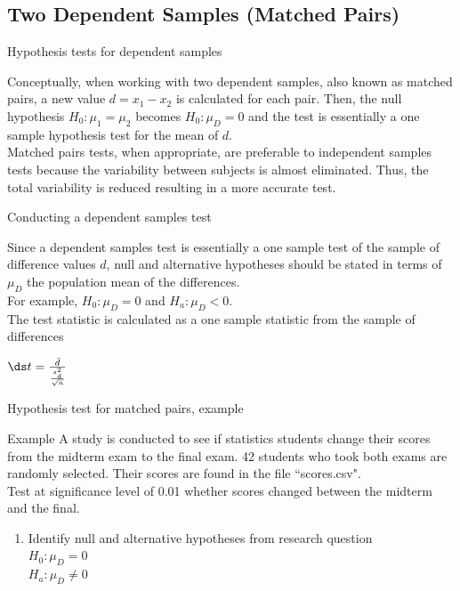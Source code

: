 \documentclass[xcolor=table, handout]{beamer}
\begin{document}
\subsection{Two Dependent Samples (Matched Pairs)}

\begin{frame}{Hypothesis tests for dependent samples}
\begin{block}{}
\large
Conceptually, when working with two dependent samples, also known as matched pairs, a new value $d = x_1 - x_2$ is calculated for each pair. Then, the null hypothesis $H_0: \mu_1 = \mu_2$ becomes $H_0: \mu_D = 0$ and the test is essentially a one sample hypothesis test for the mean of $d$.\\
\pause\medskip
Matched pairs tests, when appropriate, are preferable to independent samples tests because the variability between subjects is almost eliminated. Thus, the total variability is reduced resulting in a more accurate test. 
\end{block}
\end{frame}

\begin{frame}{Conducting a dependent samples test}
\begin{block}{}
\large
Since a dependent samples test is essentially a one sample test of the sample of difference values $d$, null and alternative hypotheses should be stated in terms of $\mu_D$ the population mean of the differences.\\
\pause\medskip
For example, $H_0: \mu_D = 0$ and $H_a: \mu_D < 0$.\\
\pause\medskip
The test statistic is calculated as a one sample statistic from the sample of differences\\
\medskip
{\centering $\ds t = \frac {\bar d}{\frac{s_d^2}{\sqrt{n}}}$ \par}
\medskip
\end{block}
\end{frame}


\begin{frame}{Hypothesis test for matched pairs, example}
\large
\begin{exampleblock}{Example}
A study is conducted to see if statistics students change their scores from the midterm exam to the final exam. 42 students who took both exams are randomly selected. Their scores are found in the file ``scores.csv".\\
\medskip
Test at significance level of 0.01 whether scores changed between the midterm and the final.
\begin{enumerate}
\pause\item Identify null and alternative hypotheses from research question\\
\pause$H_0: \mu_D = 0$\\
$H_a: \mu_D \ne 0$\\
\end{enumerate}
\end{exampleblock}
\end{frame}
\end{document}
